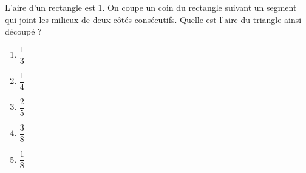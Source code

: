 L'aire d'un rectangle est 1. On coupe un coin du rectangle suivant un segment qui joint les milieux de deux côtés consécutifs. Quelle est l'aire du triangle ainsi découpé ?
\begin{multicols}{5}
  \begin{enumerate}[A/]
  \item $\dfrac13$
  \item $\dfrac14$
  \item $\dfrac25$
  \item $\dfrac38$
  \item $\dfrac18$
  \end{enumerate}
\end{multicols}